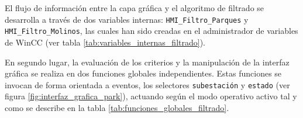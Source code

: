 El flujo de información entre la capa gráfica y el algoritmo de filtrado se desarrolla a través de dos variables internas: \texttt{HMI\_Filtro\_Parques} y \texttt{HMI\_Filtro\_Molinos}, las cuales han sido creadas en el administrador de variables de WinCC (ver tabla \ref{tab:variables_internas_filtrado}).

\begin{table}[tb]
    \centering
    \caption{Especificación técnica de las variables internas para el almacenamiento de filtros.}
    \label{tab:variables_internas_filtrado}
    \vspace{1cm}
\end{table}
En segundo lugar, la evaluación de los criterios y la manipulación de la interfaz gráfica se realiza en dos funciones globales independientes. Estas funciones se invocan de forma orientada a eventos, los selectores \texttt{subestación} y \texttt{estado} (ver figura \ref{fig:interfaz_grafica_park}), actuando según el modo operativo activo tal y como se describe en la tabla \ref{tab:funciones_globales_filtrado}.\par

